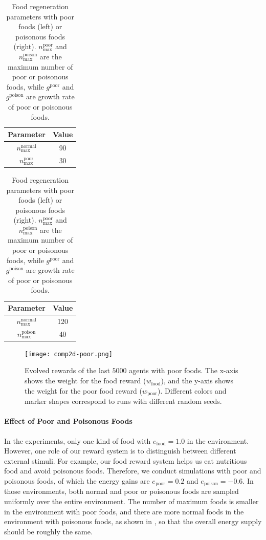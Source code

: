 \begin{table}[t]
  \begin{subtable}[h]{0.45\columnwidth}
    \centering
    \begin{tabular}{cc}
      \toprule
      Parameter & Value \\
      \midrule
      $n_{\textrm{max}}^{\textrm{normal}}$ & 90 \\
      $n_{\textrm{max}}^{\textrm{poor}}$ & 30 \\
      \bottomrule
    \end{tabular}
  \end{subtable}
  \begin{subtable}[h]{0.45\columnwidth}
    \centering
    \begin{tabular}{cc}
      \toprule
      Parameter & Value \\
      \midrule
      $n_{\textrm{max}}^{\textrm{normal}}$ & 120 \\
      $n_{\textrm{max}}^{\textrm{poison}}$ & 40 \\
      \bottomrule
    \end{tabular}
  \end{subtable}
  \caption{
    Food regeneration parameters with poor foods (left) or poisonous foods (right).
    $n_{\textrm{max}}^{\textrm{poor}}$ and $n_{\textrm{max}}^{\textrm{poison}}$ are the maximum number of poor or poisonous foods, while $g^{\textrm{poor}}$ and $g^{\textrm{poison}}$ are growth rate of poor or poisonous foods.
  }\label{table:pp}
\end{table}

\begin{figure}[t]
  \centering
  \texttt{[image: comp2d-poor.png]}
  \caption{
    Evolved rewards of the last $5000$ agents with poor foods.
    The x-axis shows the weight for the food reward ($w_{\mathrm{food}}$), and the y-axis shows the weight for the poor food reward ($w_{\mathrm{poor}}$).
    Different colors and marker shapes correspond to runs with different random seeds.
  }\label{figure:result-poor}
\end{figure}

\paragraph{Effect of Poor and Poisonous Foods}
In the experiments, only one kind of food with $e_{\mathrm{food}} = 1.0$ in the environment. However, one role of our reward system is to distinguish between different external stimuli. For example, our food reward system helps us eat nutritious food and avoid poisonous foods. Therefore, we conduct simulations with poor and poisonous foods, of which the energy gains are $e_{\mathrm{poor}} = 0.2$ and $e_{\mathrm{poison}} = -0.6$. In those environments, both normal and poor or poisonous foods are sampled uniformly over the entire environment. The number of maximum foods is smaller in the environment with poor foods, and there are more normal foods in the environment with poisonous foods, as shown in , so that the overall energy supply should be roughly the same.

